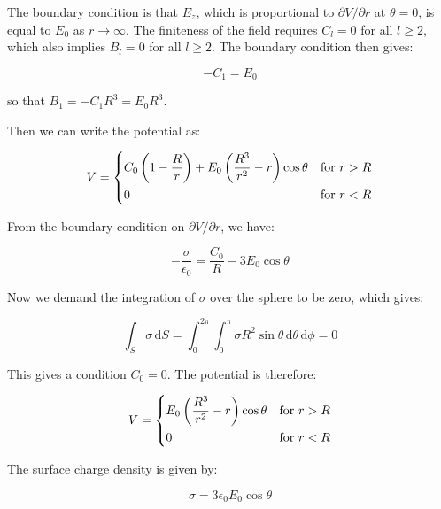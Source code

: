 \documentclass[12pt]{article}
\begin{document}
The boundary condition is that $E_{z}$, which is proportional to $\partial V/\partial r$ at $\theta = 0$, is equal to $E_{0}$ as $r \to \infty$. The finiteness of the field requires $C_{l} = 0$ for all $l \ge 2$, which also implies $B_{l} = 0$ for all $l \ge 2$. The boundary condition then gives:

\begin{equation}
    -C_{1} = E_{0}
\end{equation}

so that $B_{1} = -C_{1} R^{3} = E_{0} R^{3}$.

Then we can write the potential as:

\begin{equation}
V =
\begin{dcases}
    C_{0} \left( 1 - \frac{R}{r} \right) + E_{0} \left( \frac{R^{3}}{r^{2}} - r \right) \cos{\theta} & \text{for } r > R \\
    0 & \text{for } r < R
\end{dcases}
\end{equation}

From the boundary condition on $\partial V/\partial r$, we have:

\begin{equation}
    -\frac{\sigma}{\epsilon_{0}} = \frac{C_{0}}{R} - 3E_{0} \cos{\theta}
\end{equation}

Now we demand the integration of $\sigma$ over the sphere to be zero, which gives:

\begin{equation}
    \int_{S} \sigma \, \mathrm{d}S = \int_{0}^{2\pi} \int_{0}^{\pi} \sigma R^{2} \sin{\theta} \, \mathrm{d}\theta \, \mathrm{d}\phi = 0
\end{equation}

This gives a condition $C_{0} = 0$. The potential is therefore:

\begin{equation}
V =
\begin{dcases}
    E_{0} \left( \frac{R^{3}}{r^{2}} - r \right) \cos{\theta} & \text{for } r > R \\
    0 & \text{for } r < R
\end{dcases}
\end{equation}

The surface charge density is given by:

\begin{equation}
    \sigma = 3\epsilon_{0} E_{0} \cos{\theta}
\end{equation}
\end{document}
